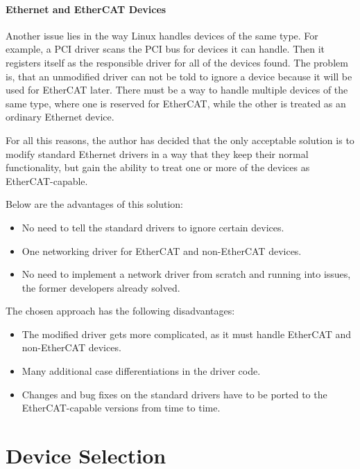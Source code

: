 \documentclass[a4paper,12pt,BCOR6mm,bibtotoc,idxtotoc]{scrbook}
\begin{document}
\paragraph{Ethernet and EtherCAT Devices}

Another issue lies in the way Linux handles devices of the same type.
For example, a PCI driver scans the PCI bus for devices it
can handle. Then it registers itself as the responsible driver for all
of the devices found. The problem is, that an unmodified driver can
not be told to ignore a device because it will be used for EtherCAT
later. There must be a way to handle multiple devices of the same
type, where one is reserved for EtherCAT, while the other is treated
as an ordinary Ethernet device.

For all this reasons, the author has decided that the only acceptable
solution is to modify standard Ethernet drivers in a way that they
keep their normal functionality, but gain the ability to treat one or
more of the devices as EtherCAT-capable.

Below are the advantages of this solution:

\begin{itemize}
\item No need to tell the standard drivers to ignore certain devices.
\item One networking driver for EtherCAT and non-EtherCAT devices.
\item No need to implement a network driver from scratch and running
  into issues, the former developers already solved.
\end{itemize}

The chosen approach has the following disadvantages:

\begin{itemize}
\item The modified driver gets more complicated, as it must handle
  EtherCAT and non-EtherCAT devices.
\item Many additional case differentiations in the driver code.
\item Changes and bug fixes on the standard drivers have to be ported
  to the Ether\-CAT-capable versions from time to time.
\end{itemize}


\section{Device Selection}
\label{sec:deviceselection}
\end{document}
